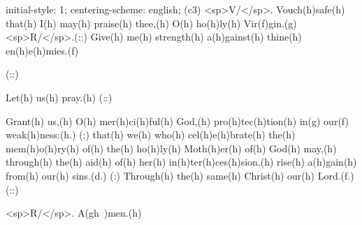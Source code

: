 initial-style: 1;
centering-scheme: english;
(c3) <sp>V/</sp>. Vouch(h)safe(h) that(h) I(h) may(h) praise(h) thee,(h) O(h) ho(h)ly(h) Vir(f)gin.(g) <sp>R/</sp>.(::) Give(h) me(h) strength(h) a(h)gainst(h) thine(h) en(h)e(h)mies.(f)

(::)

Let(h) us(h) pray.(h) (::)

Grant(h) us,(h) O(h) mer(h)ci(h)ful(h) God,(h) pro(h)tec(h)tion(h) in(g) our(f) weak(h)ness:(h.) (;) that(h) we(h) who(h) cel(h)e(h)brate(h) the(h) mem(h)o(h)ry(h) of(h) the(h) ho(h)ly(h) Moth(h)er(h) of(h) God(h) may,(h) through(h) the(h) aid(h) of(h) her(h) in(h)ter(h)ces(h)sion,(h) rise(h) a(h)gain(h) from(h) our(h) sins.(d.) (:) Through(h) the(h) same(h) Christ(h) our(h) Lord.(f.) (::)

<sp>R/</sp>. A(gh~)men.(h)